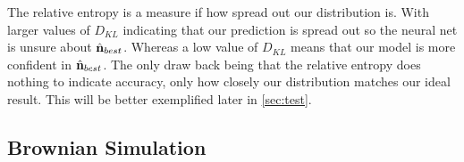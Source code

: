 The relative entropy is a measure if how spread out our distribution
is. With larger values of $D_{KL}$ indicating that our prediction is 
spread out so the neural net is unsure about $\hat{\bf n}_{best}$. 
Whereas a low value of $D_{KL}$ means that our model is more confident 
in $\hat{\bf n}_{best}$. The only draw back being that the relative 
entropy does nothing to indicate accuracy, only how closely our 
distribution matches our ideal result. This will be better 
exemplified later in \ref{sec:test}.
\subsection{Brownian Simulation}
\label{sec:brownian}

